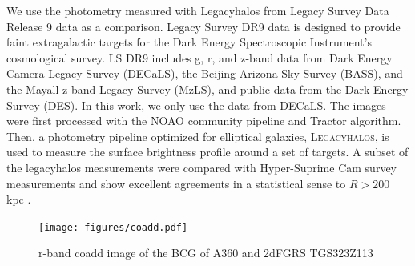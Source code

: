 \documentclass[SE,lsstdraft,authoryear,toc]{lsstdoc}
\begin{document}
We use the photometry measured with Legacyhalos \citep{liReachingEdgeProbing2022,moustakasSienaGalaxyAtlas2023} from Legacy Survey Data Release 9 data as a comparison. Legacy Survey DR9 data \citep[LS DR9;][]{schlegelDESILegacyImaging2021} is designed to provide faint extragalactic targets for the Dark Energy Spectroscopic Instrument's cosmological survey. LS DR9 includes g, r, and z-band data from Dark Energy Camera Legacy Survey (DECaLS), the Beijing-Arizona Sky Survey (BASS), and the Mayall z-band Legacy Survey (MzLS), and public data from the Dark Energy Survey (DES). In this work, we only use the data from DECaLS. The images were first processed with the NOAO community pipeline and Tractor algorithm. Then, a photometry pipeline optimized for elliptical galaxies, \textsc{Legacyhalos}, is used to measure the surface brightness profile around a set of targets. A subset of the legacyhalos measurements were compared with Hyper-Suprime Cam survey measurements and show excellent agreements in a statistical sense to $R > 200$ kpc \citep{liReachingEdgeProbing2022}.

\begin{figure}[htbp]
  \centering
  \texttt{[image: figures/coadd.pdf]}
  \caption{r-band coadd image of the BCG of A360 and 2dFGRS TGS323Z113 }
  \label{fig:image}
\end{figure}
\end{document}
